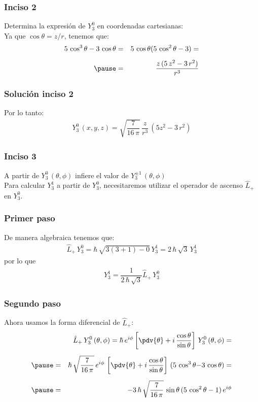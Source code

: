 \begin{frame}
\frametitle{Inciso 2}
Determina la expresión de $Y_{3}^{0}$ en coordenadas cartesianas:
\\
\bigskip
\pause
Ya que $\cos \theta = z/r$, tenemos que:
\begin{eqnarray*}
5 \, \cos^{3} \theta - 3 \, \cos \theta &=& 5 \, \cos \theta(5 \, \cos^{2} \theta - 3) = \\[0.5em] \pause
&=& \dfrac{z \, (5 \, z^{2} - 3 \, r^{2})}{r^{3}}
\end{eqnarray*}
\end{frame}
\begin{frame}
\frametitle{Solución inciso 2}
Por lo tanto:
\pause
\begin{align*}
Y_{3}^{0} \, (x, y, z) = \sqrt{\dfrac{7}{16 \, \pi}} \, \dfrac{z}{r^{3}} \, (5 z^{2} - 3 \, r^{2})
\end{align*}
\end{frame}
\begin{frame}
\frametitle{Inciso 3}
A partir de $Y_{3}^{0} \, (\theta, \phi)$ infiere el valor de $Y_{3}^{\pm 1} \, (\theta, \phi)$
\\
\bigskip
\pause
Para calcular $Y_{3}^{1}$ a partir de $Y_{3}^{0}$, necesitaremos utilizar el operador de ascenso $\hat{L}_{+}$ en $Y_{3}^{0}$.
\end{frame}
\begin{frame}
\frametitle{Primer paso}
De manera algebraica tenemos que:
\begin{align}
\hat{L}_{+} \, Y_{3}^{0} = \hbar \, \sqrt{3 (3 + 1) - 0} \, Y_{3}^{1} = 2 \, \hbar \, \sqrt{3} \, Y_{3}^{1}
\label{eq:ecuacion_05_194}
\end{align}
\pause
por lo que
\begin{align}
Y_{3}^{1} = \dfrac{1}{2 \, \hbar \, \sqrt{3}} \hat{L}_{+} \, Y_{3}^{0}
\label{eq:ecuacion_05_195}
\end{align}
\end{frame}
\begin{frame}
\frametitle{Segundo paso}
Ahora usamos la forma diferencial de $\hat{L}_{+}$:
\begin{eqnarray*}
&{}&\hat{L}_{+} \, Y_{3}^{0} \, (\theta, \phi) = \hbar \, e^{i \phi} \left[ \pdv{\theta} + i \, \dfrac{\cos \theta}{\sin \theta} \right] \, Y_{3}^{0} \, (\theta, \phi) = \\[0.5em] \pause
&=& \hbar \, \sqrt{\dfrac{7}{16 \, \pi}} \, e^{i \phi} \, \left[ \pdv{\theta} + i \, \dfrac{\cos \theta}{\sin \theta} \right] \, (5 \, \cos^{3} \theta {-} 3 \, \cos \theta) = \\[0.5em] \pause
&=& - 3 \, \hbar \, \sqrt{\dfrac{7}{16 \, \pi}} \, \sin \theta \, (5 \, \cos^{2} \theta - 1) \, e^{i \phi}
\end{eqnarray*}
\end{frame}

